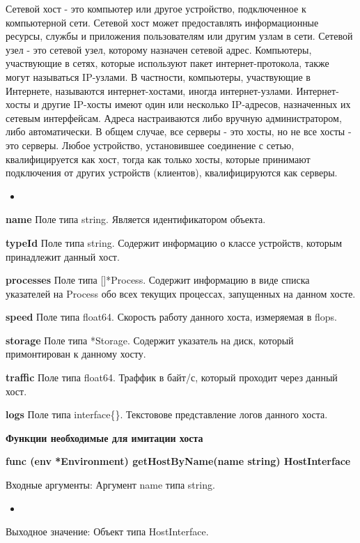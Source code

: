 \par 
Сетевой хост - это компьютер или другое устройство, подключенное к компьютерной сети. Сетевой хост может предоставлять информационные ресурсы, службы и приложения пользователям или другим узлам в сети. Сетевой узел - это сетевой узел, которому назначен сетевой адрес.
Компьютеры, участвующие в сетях, которые используют пакет интернет-протокола, также могут называться IP-узлами. В частности, компьютеры, участвующие в Интернете, называются интернет-хостами, иногда интернет-узлами. Интернет-хосты и другие IP-хосты имеют один или несколько IP-адресов, назначенных их сетевым интерфейсам. Адреса настраиваются либо вручную администратором, либо автоматически. В общем случае, все серверы - это хосты, но не все хосты - это серверы. Любое устройство, установившее соединение с сетью, квалифицируется как хост, тогда как только хосты, которые принимают подключения от других устройств (клиентов), квалифицируются как серверы.

\begin{itemize}
	\item 
\end{itemize}

\textbf{name}      
Поле типа string. Является идентификатором объекта.  

\textbf{typeId} 
Поле типа string. Содержит информацию о классе устройств, которым принадлежит данный хост. 

\textbf{processes} 
Поле типа []*Process. Содержит информацию в виде списка указателей на Process обо всех текущих процессах, запущенных на данном хосте. 

\textbf{speed}     
Поле типа float64. Скорость работу данного хоста, измеряемая в flops.

\textbf{storage}   
Поле типа *Storage. Содержит указатель на диск, который примонтирован к данному хосту.

\textbf{traffic} 
Поле типа float64. Траффик в байт/с, который проходит через данный хост.

\textbf{logs} 
Поле типа interface\{\}. Текстовове представление логов данного хоста.

\textbf{Функции необходимые для имитации хоста}

\textbf{func (env *Environment) getHostByName(name string) HostInterface}

Входные аргументы: Аргумент name типа string.
\begin{itemize}
	\item 
\end{itemize}
Выходное значение: Объект типа HostInterface.

